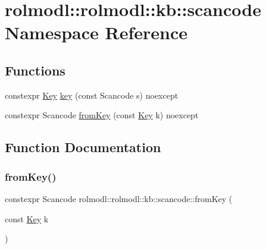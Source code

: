 \hypertarget{namespacerolmodl_1_1rolmodl_1_1kb_1_1scancode}{}\section{rolmodl\+::rolmodl\+::kb\+::scancode Namespace Reference}
\label{namespacerolmodl_1_1rolmodl_1_1kb_1_1scancode}
\subsection*{Functions}
\begin{DoxyCompactItemize}
\item 
constexpr \mbox{\hyperlink{namespacerolmodl_1_1rolmodl_1_1kb_a188e00b289aeb95ae45fb6bf2923e7e2}{Key}} \mbox{\hyperlink{namespacerolmodl_1_1rolmodl_1_1kb_1_1scancode_a282f2e12428e4cffc289b08c07c2439f}{key}} (const Scancode s) noexcept
\item 
constexpr Scancode \mbox{\hyperlink{namespacerolmodl_1_1rolmodl_1_1kb_1_1scancode_ac9ae76274417d860b8937038e2d2d3ac}{from\+Key}} (const \mbox{\hyperlink{namespacerolmodl_1_1rolmodl_1_1kb_a188e00b289aeb95ae45fb6bf2923e7e2}{Key}} k) noexcept
\end{DoxyCompactItemize}


\subsection{Function Documentation}
\mbox{\label{namespacerolmodl_1_1rolmodl_1_1kb_1_1scancode_ac9ae76274417d860b8937038e2d2d3ac}} 
\subsubsection{\texorpdfstring{fromKey()}{fromKey()}}
{\footnotesize\ttfamily constexpr Scancode rolmodl\+::rolmodl\+::kb\+::scancode\+::from\+Key (\begin{DoxyParamCaption}\item[{const \mbox{\hyperlink{namespacerolmodl_1_1rolmodl_1_1kb_a188e00b289aeb95ae45fb6bf2923e7e2}{Key}}}]{k }\end{DoxyParamCaption})\hspace{0.3cm}{\ttfamily [noexcept]}}



